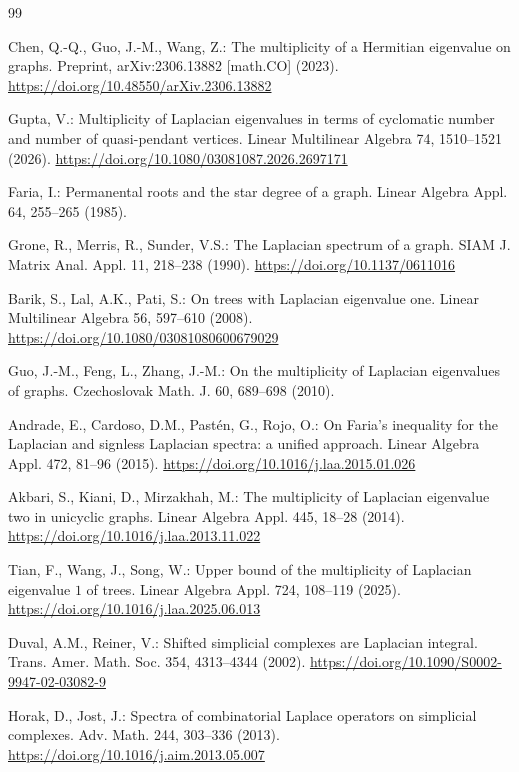 \documentclass[12pt]{article}
\theoremstyle{remark}
\begin{document}
\begin{thebibliography}{99}

Chen, Q.-Q., Guo, J.-M., Wang, Z.:
The multiplicity of a Hermitian eigenvalue on graphs.
Preprint, arXiv:2306.13882 [math.CO] (2023).
\url{https://doi.org/10.48550/arXiv.2306.13882}

Gupta, V.:
Multiplicity of Laplacian eigenvalues in terms of cyclomatic number and number of quasi-pendant vertices.
Linear Multilinear Algebra 74, 1510--1521 (2026).
\url{https://doi.org/10.1080/03081087.2026.2697171}

Faria, I.:
Permanental roots and the star degree of a graph.
Linear Algebra Appl. 64, 255--265 (1985).

Grone, R., Merris, R., Sunder, V.S.:
The Laplacian spectrum of a graph.
SIAM J. Matrix Anal. Appl. 11, 218--238 (1990).
\url{https://doi.org/10.1137/0611016}

Barik, S., Lal, A.K., Pati, S.:
On trees with Laplacian eigenvalue one.
Linear Multilinear Algebra 56, 597--610 (2008).
\url{https://doi.org/10.1080/03081080600679029}

Guo, J.-M., Feng, L., Zhang, J.-M.:
On the multiplicity of Laplacian eigenvalues of graphs.
Czechoslovak Math. J. 60, 689--698 (2010).

Andrade, E., Cardoso, D.M., Past\'en, G., Rojo, O.:
On Faria's inequality for the Laplacian and signless Laplacian spectra: a unified approach.
Linear Algebra Appl. 472, 81--96 (2015).
\url{https://doi.org/10.1016/j.laa.2015.01.026}

Akbari, S., Kiani, D., Mirzakhah, M.:
The multiplicity of Laplacian eigenvalue two in unicyclic graphs.
Linear Algebra Appl. 445, 18--28 (2014).
\url{https://doi.org/10.1016/j.laa.2013.11.022}

Tian, F., Wang, J., Song, W.:
Upper bound of the multiplicity of Laplacian eigenvalue $1$ of trees.
Linear Algebra Appl. 724, 108--119 (2025).
\url{https://doi.org/10.1016/j.laa.2025.06.013}

Duval, A.M., Reiner, V.:
Shifted simplicial complexes are Laplacian integral.
Trans. Amer. Math. Soc. 354, 4313--4344 (2002).
\url{https://doi.org/10.1090/S0002-9947-02-03082-9}

Horak, D., Jost, J.:
Spectra of combinatorial Laplace operators on simplicial complexes.
Adv. Math. 244, 303--336 (2013).
\url{https://doi.org/10.1016/j.aim.2013.05.007}


\end{thebibliography}
\end{document}
